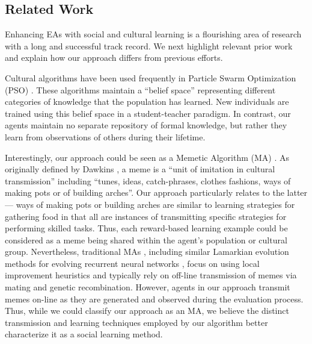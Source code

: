 \documentclass{acm_proc_article-sp}
\begin{document}
\subsection*{Related Work}

Enhancing EAs with social and cultural learning is a flourishing area of research with a long and successful track record. We next highlight relevant prior work and explain how our approach differs from previous efforts.

Cultural algorithms \cite{reynolds1994introduction} have been used frequently in Particle Swarm Optimization (PSO) \cite{kennedy1995particle}. These algorithms maintain a ``belief space'' representing different categories of knowledge that the population has learned. New individuals are trained using this belief space in a student-teacher paradigm. In contrast, our agents maintain no separate repository of formal knowledge, but rather they learn from observations of others during their lifetime.

Interestingly, our approach could be seen as a Memetic Algorithm (MA) \cite{moscato1989evolution}. As originally defined by Dawkins \cite{dawkins2006selfish}, a meme is a ``unit of imitation in cultural transmission'' including ``tunes, ideas, catch-phrases, clothes fashions, ways of making pots or of building arches''. Our approach particularly relates to the latter--- ways of making pots or building arches are similar to learning strategies for gathering food in that all are instances of transmitting specific strategies for performing skilled tasks. Thus, each reward-based learning example could be considered as a meme being shared within the agent's population or cultural group. Nevertheless, traditional MAs \cite{onwubolu2004new}, including similar Lamarkian evolution methods for evolving recurrent neural networks \cite{ku2000study}, focus on using local improvement heuristics and typically rely on off-line transmission of memes via mating and genetic recombination. However, agents in our approach transmit memes on-line as they are generated and observed during the evaluation process. Thus, while we could classify our approach as an MA, we believe the distinct transmission and learning techniques employed by our algorithm better characterize it as a social learning method.
\end{document}
